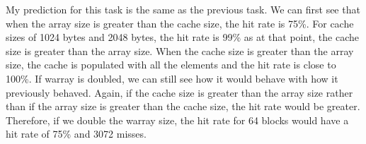 \documentclass{article}
\begin{document}
\begin{table}[h]
\end{table}

\noindent
My prediction for this task is the same as the previous task.
We can first see that when the array size is greater than the cache size, the hit rate is 75\%.
For cache sizes of 1024 bytes and 2048 bytes, the hit rate is 99\% as at that point,
the cache size is greater than the array size.
When the cache size is greater than the array size, the cache is populated with all the elements
and the hit rate is close to 100\%. If warray is doubled, we can still see
how it would behave with how it previously behaved. Again, if the cache size is greater than the array size
rather than if the array size is greater than the cache size, the hit rate would be greater. Therefore,
if we double the warray size, the hit rate for 64 blocks would have a hit rate of 75\% and 3072 misses.
\end{document}
